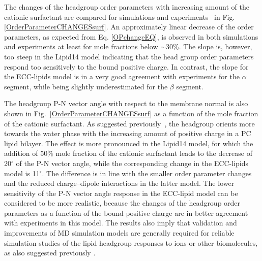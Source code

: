 \documentclass[aip,jcp,twocolumn]{revtex4}
\begin{document}
The changes of the headgroup order parameters with increasing amount of 
the cationic surfactant are compared for simulations and experiments~\cite{scherer89} in Fig. \ref{OrderParameterCHANGESsurf}.
An approximately linear decrease of the order parameters, as expected from Eq. \ref{OPchangeEQ},
is observed in both simulations and experiments at least for mole fractions
below $\sim$30\%. The slope is, however, too steep in the Lipid14 model indicating that 
the head group order parameters respond too sensitively to the bound positive charge.
In contrast, the slope for the ECC-lipids model is in a very good agreement with experiments
for the $\alpha$ segment, while being slightly
underestimated for the $\beta$ segment.

The headgroup P-N vector angle with respect to the membrane normal
is also shown in Fig.~\ref{OrderParameterCHANGESsurf}
as a function of the mole fraction of the cationic surfactant.
As suggested previously~\cite{seelig87}, the headgroup orients
more towards the water phase with the increasing amount of positive
charge in a PC lipid bilayer. The effect is more pronounced in the
Lipid14 model, for which the addition of 50\% mole fraction of the cationic
surfactant leads to the decrease of 20$^{\circ}$ of the P-N vector angle,
while the corresponding change in the ECC-lipids model is 11$^{\circ}$.
The difference is in line with the smaller order parameter 
changes and the reduced charge--dipole interactions in the latter model.
The lower sensitivity of the P-N vector angle response in the ECC-lipid
model can be considered to be more realistic, because the changes of the headgroup
order parameters as a function of the bound positive charge
are in better agreement with experiments in this model.
The results also imply that validation and improvements of MD simulation
models are generally required for reliable simulation studies of the
lipid headgroup responses to ions or other biomolecules, as also suggested
previously \cite{botan15}.


%
%
\end{document}
